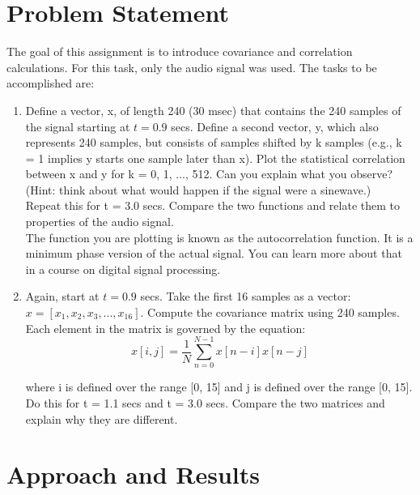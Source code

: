  
\usepackage{mcode}


\maketitle %

\section{Problem Statement} 
The goal of this assignment is to introduce covariance and correlation calculations. For this task, only the audio signal was used. The tasks to be accomplished are:
\begin{enumerate}
\item Define a vector, x, of length 240 (30 msec) that contains the 240 samples of the signal starting at $t=0.9$ secs. Define a second vector, y, which also represents 240 samples, but consists of samples shifted by k samples (e.g., k = 1 implies y starts one sample later than x). Plot the statistical correlation between x and y for k = 0, 1, ..., 512. Can you explain what you observe? (Hint: think about what would happen if the signal were a sinewave.)\\

Repeat this for t = 3.0 secs. Compare the two functions and relate them to properties of the audio signal.\\

The function you are plotting is known as the autocorrelation function. It is a minimum phase version of the actual signal. You can learn more about that in a course on digital signal processing.

\item Again, start at $t=0.9$ secs. Take the first 16 samples as a vector: $x = [x_1, x_2, x_3, ..., x_{16}]$. Compute the covariance matrix using 240 samples. Each element in the matrix is governed by the equation:
\begin{equation}
x[i,j] = \frac{1}{N}\sum_{n=0}^{N-1} x[n-i]x[n-j]
\end{equation}

where i is defined over the range [0, 15] and j is defined over the range [0, 15]. Do this for t = 1.1 secs and t = 3.0 secs. Compare the two matrices and explain why they are different.
\end{enumerate}
\section{Approach and Results} 

